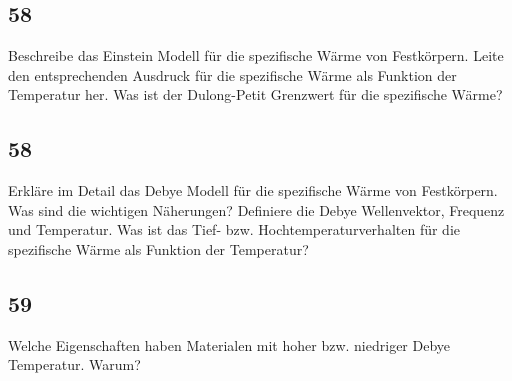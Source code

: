 \documentclass[12pt,a4paper]{report}
\newenvironment{myfrag}{\begin{it}}{\end{it}\vspace{3mm}\par}
\numberwithin{equation}{section}
\begin{document}
\subsection{58}
\begin{myfrag}
Beschreibe das Einstein Modell für die spezifische Wärme von Festkörpern.
Leite den entsprechenden Ausdruck für die spezifische Wärme als Funktion
der Temperatur her. Was ist der Dulong-Petit Grenzwert für die spezifische
Wärme?
\end{myfrag}
\subsection{58}
\begin{myfrag}
Erkläre im Detail das Debye Modell für die spezifische Wärme von
Festkörpern. Was sind die wichtigen Näherungen? Definiere die Debye
Wellenvektor, Frequenz und Temperatur. Was ist das Tief- bzw.
Hochtemperaturverhalten für die spezifische Wärme als Funktion der
Temperatur?
\end{myfrag}
\subsection{59}
\begin{myfrag}
Welche Eigenschaften haben Materialen mit hoher bzw. niedriger Debye
Temperatur. Warum?
\end{myfrag}
\end{document}

